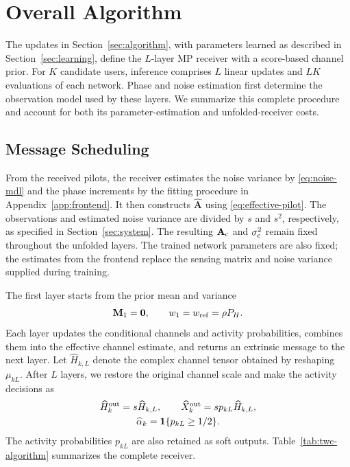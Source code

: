 \section{Overall Algorithm}
\label{sec:overall}

The updates in Section~\ref{sec:algorithm}, with parameters learned
as described in Section~\ref{sec:learning}, define the $L$-layer
MP receiver with a score-based channel prior. For $K$ candidate users, inference comprises $L$
linear updates and $LK$ evaluations of each network. Phase and noise
estimation first determine the observation model used by these layers.
We summarize this complete procedure and account for both its
parameter-estimation and unfolded-receiver costs.

\subsection{Message Scheduling}

From the received pilots, the receiver estimates the noise variance
by \eqref{eq:noise-mdl} and the phase increments by the fitting
procedure in Appendix~\ref{app:frontend}. It then constructs
$\widehat{\mathbf A}$ using \eqref{eq:effective-pilot}. The observations
and estimated noise variance are divided by $s$ and $s^2$,
respectively, as specified in Section~\ref{sec:system}. The resulting
$\mathbf A_{\rm c}$ and $\sigma_{\rm c}^2$ remain fixed throughout
the unfolded layers. The trained network parameters are also fixed;
the estimates from the frontend replace the sensing matrix and noise
variance supplied during training.

The first layer starts from the prior mean and variance
\begin{equation}
 \mathbf M_1=\mathbf0,\qquad w_1=w_{\rm ref}=\rho P_H.
 \label{eq:twc-initialization}
\end{equation}
Each layer updates the conditional channels and activity
probabilities, combines them into the effective channel estimate,
and returns an extrinsic message to the next layer. Let
$\widehat H_{k,L}$ denote the complex channel tensor obtained by
reshaping $\mu_{kL}$. After $L$ layers, we restore the original channel
scale and make the activity decisions as
\begin{equation}
 \begin{gathered}
 \widehat H_k^{\rm out}=s\widehat H_{k,L},\qquad
 \widehat X_k^{\rm out}=s p_{kL}\widehat H_{k,L},\\
 \widehat\alpha_k=\mathbf1\{p_{kL}\geq1/2\}.
 \end{gathered}
 \label{eq:twc-final-output}
\end{equation}
The activity probabilities $p_{kL}$ are also retained as soft outputs.
Table~\ref{tab:twc-algorithm} summarizes the complete receiver.

